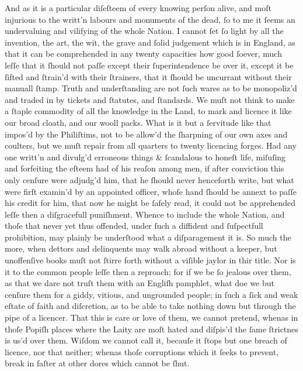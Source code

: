 And as it is a particular diſeſteem of every knowing perſon alive, and moſt
injurious to the writt'n labours and monuments of the dead, ſo to me it ſeems an
undervaluing and vilifying of the whole Nation.  I cannot ſet ſo light by all
the invention, the art, the wit, the grave and ſolid judgement which is in
England, as that it can be comprehended in any twenty capacities how good
ſoever, much leſſe that it ſhould not paſſe except their ſuperintendence be over
it, except it be ſifted and ſtrain'd with their ſtrainers, that it ſhould be
uncurrant without their manuall ſtamp.  Truth and underſtanding are not ſuch
wares as to be monopoliz'd and traded in by tickets and ſtatutes, and ſtandards.
We muſt not think to make a ſtaple commodity of all the knowledge in the Land,
to mark and licence it like our broad cloath, and our wooll packs.  What is it
but a ſervitude like that impos'd by the Philiſtims, not to be allow'd the
ſharpning of our own axes and coulters, but we muſt repair from all quarters to
twenty licencing forges.  Had any one writt'n and divulg'd erroneous things \&
ſcandalous to honeſt life, miſuſing and forfeiting the eſteem had of his reaſon
among men, if after conviction this only cenſure were adjudg'd him, that he
ſhould never henceforth write, but what were firſt examin'd by an appointed
officer, whoſe hand ſhould be annext to paſſe his credit for him, that now he
might be ſafely read, it could not be apprehended leſſe then a diſgracefull
puniſhment.  Whence to include the whole Nation, and thoſe that never yet thus
offended, under ſuch a diffident and ſuſpectfull prohibition, may plainly be
underſtood what a diſparagement it is.  So much the more, when dettors and
delinquents may walk abroad without a keeper, but unoffenſive books muſt not
ſtirre forth without a viſible jaylor in thir title.  Nor is it to the common
people leſſe then a reproach; for if we be ſo jealous over them, as that we dare
not truſt them with an Engliſh pamphlet, what doe we but cenſure them for a
giddy, vitious, and ungrounded people; in ſuch a ſick and weak eſtate of faith
and diſcretion, as to be able to take nothing down but through the pipe of a
licencer.  That this is care or love of them, we cannot pretend, whenas in thoſe
Popiſh places where the Laity are moſt hated and diſpis'd the ſame ſtrictnes is
us'd over them.  Wiſdom we cannot call it, becauſe it ſtops but one breach of
licence, nor that neither; whenas thoſe corruptions which it ſeeks to prevent,
break in faſter at other dores which cannot be ſhut.

